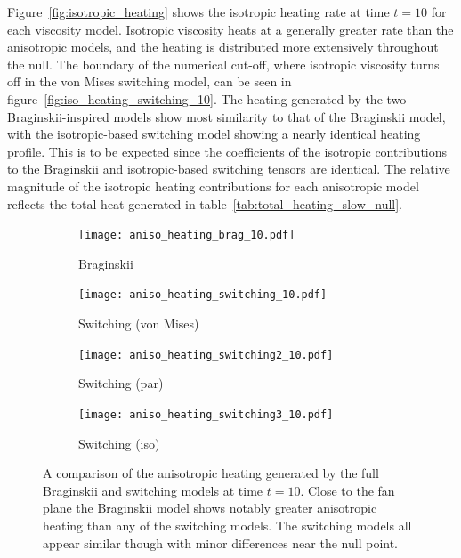 Figure~\ref{fig:isotropic_heating} shows the isotropic heating rate at time $t=10$ for each viscosity model. Isotropic viscosity heats at a generally greater rate than the anisotropic models, and the heating is distributed more extensively throughout the null. The boundary of the numerical cut-off, where isotropic viscosity turns off in the von Mises switching model, can be seen in figure~\ref{fig:iso_heating_switching_10}. The heating generated by the two Braginskii-inspired models show most similarity to that of the Braginskii model, with the isotropic-based switching model showing a nearly identical heating profile. This is to be expected since the coefficients of the isotropic contributions to the Braginskii and isotropic-based switching tensors are identical. The relative magnitude of the isotropic heating contributions for each anisotropic model reflects the total heat generated in table~\ref{tab:total_heating_slow_null}.

\begin{figure}[t]
    \hfill
    \begin{subfigure}{0.49\textwidth}
      \texttt{[image: aniso\_heating\_brag\_10.pdf]}
      \caption{Braginskii}%
      \label{fig:aniso_heating_brag_10}
    \end{subfigure}
    \hfill
    \begin{subfigure}{0.49\textwidth}
      \texttt{[image: aniso\_heating\_switching\_10.pdf]}
      \caption{Switching (von Mises)}%
      \label{fig:aniso_heating_switching_10}
    \end{subfigure}
    \hfill
    \begin{subfigure}{0.49\textwidth}
      \texttt{[image: aniso\_heating\_switching2\_10.pdf]}
      \caption{Switching (par)}%
      \label{fig:aniso_heating_switching2_10}
    \end{subfigure}
    \hfill
    \begin{subfigure}{0.49\textwidth}
      \texttt{[image: aniso\_heating\_switching3\_10.pdf]}
      \caption{Switching (iso)}%
      \label{fig:aniso_heating_switching3_10}
    \end{subfigure}
    \caption{A comparison of the anisotropic heating generated by the full Braginskii and switching models at time $t=10$. Close to the fan plane the Braginskii model shows notably greater anisotropic heating than any of the switching models. The switching models all appear similar though with minor differences near the null point.}
\label{fig:anisotropic_heating}%
\end{figure}

